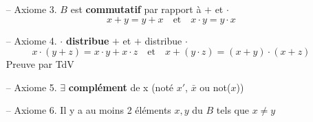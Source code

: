 \begin{itemize}
\begin{equation}
	\end{equation}
	\item[-- Axiome 3.] $B$ est \textbf{commutatif} par rapport à $+$ et $\cdot$
	\begin{equation}
		x+y=y+x\quad\text{et}\quad x\cdot y=y\cdot x
	\end{equation}
	\item[-- Axiome 4.] $\cdot$ \textbf{distribue} $+$ et $+$ distribue $\cdot$
	\begin{equation}
		x\cdot(y+z)=x\cdot y+x\cdot z\quad\text{et}\quad x+(y\cdot z)=(x+y)\cdot(x+z)
	\end{equation} 
	\hfill Preuve par TdV
	\item[-- Axiome 5.] $\exists$ \textbf{complément} de x (noté $x'$, $\bar{x}$ ou not($x$))
	\item[-- Axiome 6.] Il y a au moins 2 éléments $x,y$ du $B$ tels que $x\neq y$
\end{itemize}
